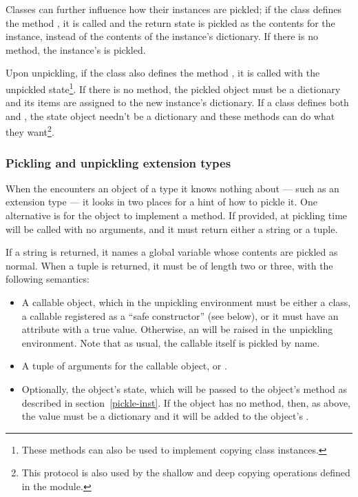 
Classes can further influence how their instances are pickled; if the
class defines the method , it is called and the
return state is pickled as the contents for the instance, instead of
the contents of the instance's dictionary.  If there is no
 method, the instance's  is
pickled.

Upon unpickling, if the class also defines the method
, it is called with the unpickled
state\footnote{These methods can also be used to implement copying
class instances.}.  If there is no  method, the
pickled object must be a dictionary and its items are assigned to the
new instance's dictionary.  If a class defines both
 and , the state object
needn't be a dictionary and these methods can do what they
want\footnote{This protocol is also used by the shallow and deep
copying operations defined in the
 module.}.

\subsubsection{Pickling and unpickling extension types}

When the  encounters an object of a type it knows
nothing about --- such as an extension type --- it looks in two places
for a hint of how to pickle it.  One alternative is for the object to
implement a  method.  If provided, at pickling
time  will be called with no arguments, and it
must return either a string or a tuple.

If a string is returned, it names a global variable whose contents are
pickled as normal.  When a tuple is returned, it must be of length two
or three, with the following semantics:

\begin{itemize}

\item A callable object, which in the unpickling environment must be
      either a class, a callable registered as a ``safe constructor''
      (see below), or it must have an attribute
       with a true value.  Otherwise,
      an  will be raised in the unpickling
      environment.  Note that as usual, the callable itself is pickled
      by name.

\item A tuple of arguments for the callable object, or .

\item Optionally, the object's state, which will be passed to
      the object's  method as described in
      section~\ref{pickle-inst}.  If the object has no
       method, then, as above, the value must
      be a dictionary and it will be added to the object's
      .

\end{itemize}

